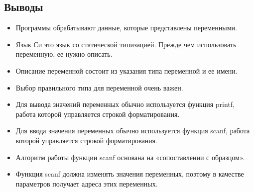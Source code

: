 \subsection{Выводы}

\begin{itemize}
  \item Программы обрабатывают данные, которые представлены переменными.
  \item Язык Си это язык со статической типизацией. Прежде чем использовать переменную, ее нужно описать.
  \item Описание переменной состоит из указания типа переменной и ее имени.
  \item Выбор правильного типа для переменной очень важен.
  \item Для вывода значений переменных обычно используется функция printf, работа которой управляется строкой форматирования.
  \item Для ввода значения переменных обычно используется функция scanf, работа которой управляется строкой форматирования.
  \item Алгоритм работы функции scanf основана на «сопоставлении с образцом».
  \item Функция scanf должна изменять значения переменных, поэтому в качестве параметров получает адреса этих переменных.
\end{itemize}

